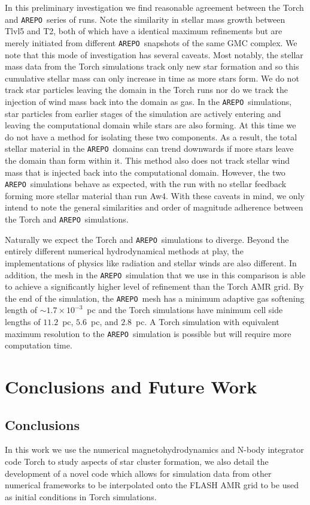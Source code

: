 \documentclass[twoside]{drexel-thesis}
\newcommand\arepo{\texttt{AREPO}}
\begin{document}
\begin{thesis}
In this preliminary investigation we find reasonable agreement between the Torch and \arepo~series of runs. Note the similarity in stellar mass growth between Tlvl5 and T2, both of which have a identical maximum refinements but are merely initiated from different \arepo~snapshots of the same GMC complex. We note that this mode of investigation has several caveats. Most notably, the stellar mass data from the Torch simulations track only new star formation and so this cumulative stellar mass can only increase in time as more stars form. We do not track star particles leaving the domain in the Torch runs nor do we track the injection of wind mass back into the domain as gas. In the \arepo~simulations, star particles from earlier stages of the simulation are actively entering and leaving the computational domain while stars are also forming. At this time we do not have a method for isolating these two components. As a result, the total stellar material in the \arepo~domains can trend downwards if more stars leave the domain than form within it. This method also does not track stellar wind mass that is injected back into the computational domain. However, the two \arepo~simulations behave as expected, with the run with no stellar feedback forming more stellar material than run Aw4. With these caveats in mind, we only intend to note the general similarities and order of magnitude adherence between the Torch and \arepo~simulations.

Naturally we expect the Torch and \arepo~simulations to diverge. Beyond the entirely different numerical hydrodynamical methods at play, the implementations of physics like radiation and stellar winds are also different. In addition, the mesh in the \arepo~simulation that we use in this comparison is able to achieve a significantly higher level of refinement than the Torch AMR grid. By the end of the simulation, the \arepo~mesh has a minimum adaptive gas softening length of $\sim 1.7\times10^{-3}$~pc and the Torch simulations have minimum cell side lengths of $11.2$~pc, $5.6$~pc, and $2.8$~pc. A Torch simulation with equivalent maximum resolution to the \arepo~simulation is possible but will require more computation time.

\chapter{Conclusions and Future Work}\label{chp:future}
\section{Conclusions}
In this work we use the numerical magnetohydrodynamics and N-body integrator code Torch to study aspects of star cluster formation, we also detail the development of a novel code which allows for simulation data from other numerical frameworks to be interpolated onto the FLASH AMR grid to be used as initial conditions in Torch simulations. 


\end{thesis}
\end{document}
